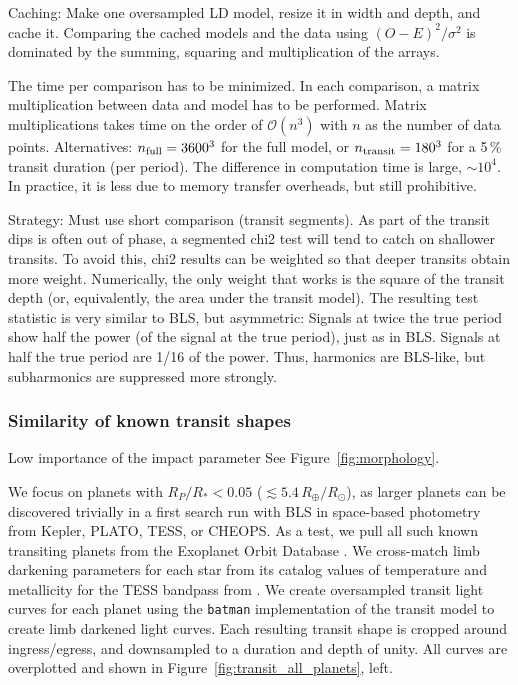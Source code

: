 \documentclass[twocolumn,tighten,longauthor]{myaastex62}
\begin{document}
Caching: Make one oversampled LD model, resize it in width and depth, and cache it. Comparing the cached models and the data using $(O-E)^2/\sigma^2$ is dominated by the summing, squaring and multiplication of the arrays.

The time per comparison has to be minimized.
In each comparison, a matrix multiplication between data and model has to be performed. Matrix multiplications takes time on the order of $\mathcal{O}(n^3)$ with $n$ as the number of data points. Alternatives: $n_{\rm full}=3600^3$ for the full model, or $n_{\rm transit}=180^3$ for a 5\,\% transit duration (per period). The difference in computation time is large, $\sim 10^4$. In practice, it is less due to memory transfer overheads, but still prohibitive.

Strategy: Must use short comparison (transit segments). As part of the transit dips is often out of phase, a segmented chi2 test will tend to catch on shallower transits. To avoid this, chi2 results can be weighted so that deeper transits obtain more weight. Numerically, the only weight that works is the square of the transit depth (or, equivalently, the area under the transit model). The resulting test statistic is very similar to BLS, but asymmetric: Signals at twice the true period show half the power (of the signal at the true period), just as in BLS. Signals at half the true period are 1/16 of the power. Thus, harmonics are BLS-like, but subharmonics are suppressed more strongly.

\subsubsection{Similarity of known transit shapes}
Low importance of the impact parameter
See Figure~\ref{fig:morphology}.


We focus on planets with $R_P/R_{*}<0.05$ ($\lesssim 5.4\,R_{\oplus}/R_{\odot}$), as larger planets can be discovered trivially in a first search run with BLS in space-based photometry from Kepler, PLATO, TESS, or CHEOPS. As a test, we pull all such known transiting planets from the Exoplanet Orbit Database \citep{2011PASP..123..412W}. We cross-match limb darkening parameters for each star from its catalog values of temperature and metallicity for the TESS bandpass from \citep{2017A&A...600A..30C}. We create oversampled transit light curves for each planet using the \texttt{batman} implementation \citep{2015PASP..127.1161K,2015ascl.soft10002K} of the \cite{2002ApJ...580L.171M} transit model to create limb darkened light curves. Each resulting transit shape is cropped around ingress/egress, and downsampled to a duration and depth of unity. All curves are overplotted and shown in Figure~\ref{fig:transit_all_planets}, left.
\end{document}
